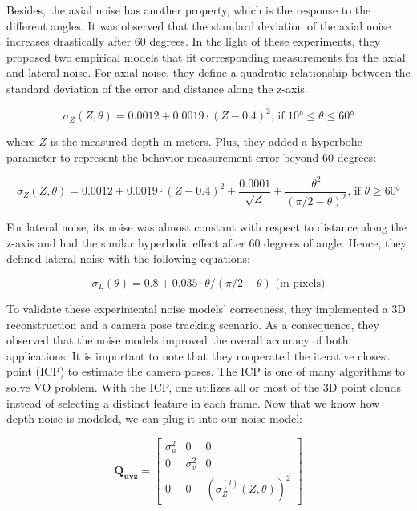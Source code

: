 \documentclass[a4paper]{report}
\numberwithin{figure}{section}
\begin{document}
Besides, the axial noise has another property, which is the response to the
different angles. It was observed that the standard deviation of the axial
noise increases drastically after 60 degrees.  In the light of these
experiments, they proposed two empirical models that fit corresponding
measurements for the axial and lateral noise.  For axial noise, they define a
quadratic relationship between the standard deviation of the error and distance
along the z-axis. 

\begin{equation}\label{eq:depth_noise_model} \sigma_Z (Z,\theta) = 0.0012 +
0.0019 \cdot (Z-0.4)^2 \text{, if } \ang{10}\leq \theta \leq \ang{60}
\end{equation}

where $Z$ is the measured depth in meters.  Plus, they added a hyperbolic
parameter to represent the behavior measurement error beyond 60 degrees:

\begin{equation} \sigma_Z (Z,\theta) = 0.0012 + 0.0019 \cdot (Z-0.4)^2 +
\frac{0.0001}{\sqrt{Z}} + \frac{\theta^2}{(\pi/2 - \theta)^2} \text{, if }
\theta \geq \ang{60} \end{equation} \label{eq:axial_noise_w_hyperbolic}

For lateral noise, its noise was almost constant with respect to distance along
the z-axis and had the similar hyperbolic effect after 60 degrees of angle.
Hence, they defined lateral noise with the following equations:

\begin{equation} \sigma_L(\theta) = 0.8 + 0.035 \cdot \theta/(\pi/2-\theta)
\text{ (in pixels)} \end{equation}

To validate these experimental noise models' correctness, they implemented a 3D
reconstruction and a camera pose tracking scenario.  As a consequence, they
observed that the noise models improved the overall accuracy of both
applications. It is important to note that they cooperated the iterative
closest point (ICP) to estimate the camera poses. The ICP is one of many
algorithms to solve VO problem.  With the ICP, one utilizes all or most of the
3D point clouds instead of selecting a distinct feature in each frame. Now that
we know how depth noise is modeled, we can plug it into our noise model:

\begin{equation} \mathbf{Q_{uvz}} = \begin{bmatrix} \sigma_u^2 & 0 & 0 \\ 0 &
\sigma_v^2 & 0 \\ 0 & 0 & (\sigma_Z^{(i)}(Z, \theta))^2 \end{bmatrix}
\end{equation}
\end{document}

